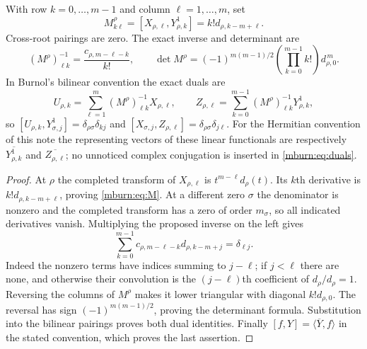 \documentclass[11pt]{article}
\begin{document}
\begin{mburntheorem}
\label{mburn:thm:jets}
With row $k=0,\ldots,m-1$ and column $\ell=1,\ldots,m$, set
\begin{equation}\label{mburn:eq:M}
 M^\rho_{k\ell}=[X_{\rho,\ell},Y^1_{\rho,k}]
        =k!d_{\rho,k-m+\ell}.
\end{equation}
Cross-root pairings are zero. The exact inverse and determinant are
\begin{equation}\label{mburn:eq:Minv}
 (M^\rho)^{-1}_{\ell k}=\frac{c_{\rho,m-\ell-k}}{k!},\qquad
 \det M^\rho=(-1)^{m(m-1)/2}
              \left(\prod_{k=0}^{m-1}k!\right)d_{\rho,0}^{\,m}.
\end{equation}
In Burnol's bilinear convention the exact duals are
\begin{equation}\label{mburn:eq:duals}
 U_{\rho,k}=\sum_{\ell=1}^{m}(M^\rho)^{-1}_{\ell k}X_{\rho,\ell},
 \qquad
 Z_{\rho,\ell}=\sum_{k=0}^{m-1}(M^\rho)^{-1}_{\ell k}Y^1_{\rho,k},
\end{equation}
so $[U_{\rho,k},Y^1_{\sigma,j}]=\delta_{\rho\sigma}\delta_{kj}$
and $[X_{\sigma,j},Z_{\rho,\ell}]=\delta_{\rho\sigma}\delta_{j\ell}$.
For the Hermitian convention of this note the representing vectors
of these linear functionals are respectively
$\overline{Y^1_{\rho,k}}$ and $\overline{Z_{\rho,\ell}}$;
no unnoticed complex conjugation is inserted in \eqref{mburn:eq:duals}.
\end{mburntheorem}
\begin{proof}
At $\rho$ the completed transform of $X_{\rho,\ell}$ is
$t^{m-\ell}d_\rho(t)$. Its $k$th derivative is
$k!d_{\rho,k-m+\ell}$, proving \eqref{mburn:eq:M}.
At a different zero $\sigma$ the denominator is nonzero and
the completed transform has a zero of order $m_\sigma$,
so all indicated derivatives vanish. Multiplying the proposed
inverse on the left gives
\[
 \sum_{k=0}^{m-1}c_{\rho,m-\ell-k}d_{\rho,k-m+j}
       =\delta_{\ell j}.
\]
Indeed the nonzero terms have indices summing to $j-\ell$;
if $j<\ell$ there are none, and otherwise their convolution
is the $(j-\ell)$th coefficient of $d_\rho/d_\rho=1$.
Reversing the columns of $M^\rho$ makes it lower triangular
with diagonal $k!d_{\rho,0}$. The reversal has sign
$(-1)^{m(m-1)/2}$, proving the determinant formula.
Substitution into the bilinear pairings proves both dual
identities. Finally $[f,Y]=\langle\overline Y,f\rangle$
in the stated convention, which proves the last assertion.
\end{proof}
\end{document}
